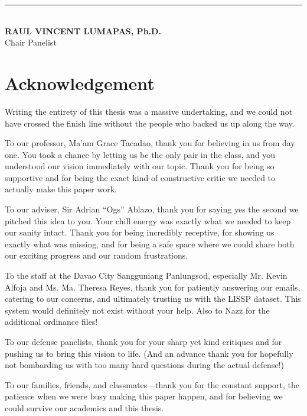 \documentclass[10pt,11pt,12pt,oneside]{book}
\begin{document}
\vspace{0.55in}
\begin{center}
\begin{minipage}[t]{0.6\textwidth}
    \centering
    \rule{2.4in}{0.7pt}\\[6pt]
    \textbf{RAUL VINCENT LUMAPAS, Ph.D.}\\[2pt]
    Chair Panelist
\end{minipage}
\end{center}

\cleardoublepage
\chapter{Acknowledgement}
Writing the entirety of this thesis was a massive undertaking, and we could not have crossed the finish line without the people who backed us up along the way.

To our professor, Ma'am Grace Tacadao, thank you for believing in us from day one. You took a chance by letting us be the only pair in the class, and you understood our vision immediately with our topic. Thank you for being so supportive and for being the exact kind of constructive critic we needed to actually make this paper work.

To our adviser, Sir Adrian ``Ogs'' Ablazo, thank you for saying yes the second we pitched this idea to you. Your chill energy was exactly what we needed to keep our sanity intact. Thank you for being incredibly receptive, for showing us exactly what was missing, and for being a safe space where we could share both our exciting progress and our random frustrations.

To the staff at the Davao City Sangguniang Panlungsod, especially Mr. Kevin Alfoja and Ms. Ma. Theresa Reyes, thank you for patiently answering our emails, catering to our concerns, and ultimately trusting us with the LISSP dataset. This system would definitely not exist without your help. Also to Nazz for the additional ordinance files!

To our defense panelists, thank you for your sharp yet kind critiques and for pushing us to bring this vision to life. (And an advance thank you for hopefully not bombarding us with too many hard questions during the actual defense!)

To our families, friends, and classmates---thank you for the constant support, the patience when we were busy making this paper happen, and for believing we could survive our academics and this thesis. 
\end{document}
